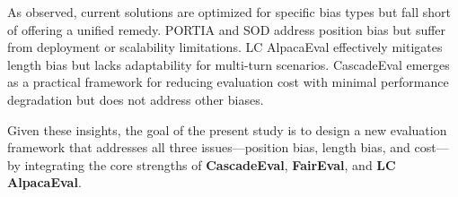 \documentclass[sigconf, authoryear]{acmart}
\begin{document}
As observed, current solutions are optimized for specific bias types but fall short of offering a unified remedy.
PORTIA and SOD address position bias but suffer from deployment or scalability limitations.
LC AlpacaEval effectively mitigates length bias but lacks adaptability for multi-turn scenarios.
CascadeEval emerges as a practical framework for reducing evaluation cost with minimal performance degradation but does not address other biases.

Given these insights, the goal of the present study is to design a new evaluation framework that addresses all three issues—position bias, length bias, and cost—by integrating the core strengths of \textbf{CascadeEval}, \textbf{FairEval}, and \textbf{LC AlpacaEval}.




\end{document}
